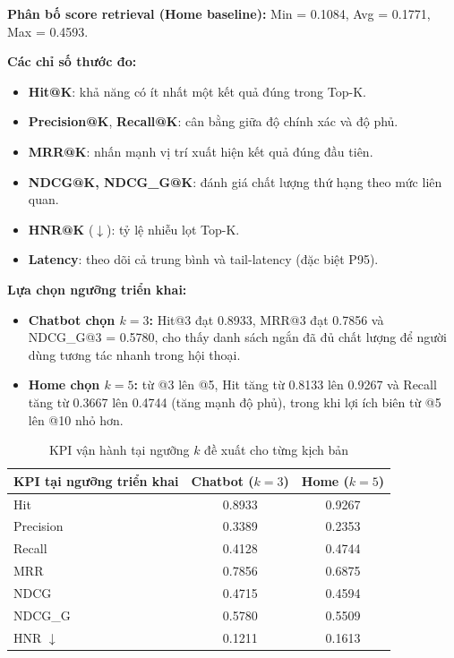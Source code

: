 \noindent\textbf{Phân bố score retrieval (Home baseline):} Min = 0.1084, Avg = 0.1771, Max = 0.4593.

\textbf{Các chỉ số thước đo:}
\begin{itemize}
    \item \textbf{Hit@K}: khả năng có ít nhất một kết quả đúng trong Top-K.
    \item \textbf{Precision@K}, \textbf{Recall@K}: cân bằng giữa độ chính xác và độ phủ.
    \item \textbf{MRR@K}: nhấn mạnh vị trí xuất hiện kết quả đúng đầu tiên.
    \item \textbf{NDCG@K, NDCG\_G@K}: đánh giá chất lượng thứ hạng theo mức liên quan.
    \item \textbf{HNR@K} ($\downarrow$): tỷ lệ nhiễu lọt Top-K.
    \item \textbf{Latency}: theo dõi cả trung bình và tail-latency (đặc biệt P95).
\end{itemize}

\textbf{Lựa chọn ngưỡng triển khai:}
\begin{itemize}
    \item \textbf{Chatbot chọn $k=3$:} Hit@3 đạt 0.8933, MRR@3 đạt 0.7856 và NDCG\_G@3 = 0.5780, cho thấy danh sách ngắn đã đủ chất lượng để người dùng tương tác nhanh trong hội thoại.
    \item \textbf{Home chọn $k=5$:} từ @3 lên @5, Hit tăng từ 0.8133 lên 0.9267 và Recall tăng từ 0.3667 lên 0.4744 (tăng mạnh độ phủ), trong khi lợi ích biên từ @5 lên @10 nhỏ hơn.
\end{itemize}

\begin{table}[H]
\centering
\begin{tabular}{|l|c|c|}
\hline
\textbf{KPI tại ngưỡng triển khai} & \textbf{Chatbot ($k=3$)} & \textbf{Home ($k=5$)} \\
\hline
Hit & 0.8933 & 0.9267 \\
\hline
Precision & 0.3389 & 0.2353 \\
\hline
Recall & 0.4128 & 0.4744 \\
\hline
MRR & 0.7856 & 0.6875 \\
\hline
NDCG & 0.4715 & 0.4594 \\
\hline
NDCG\_G & 0.5780 & 0.5509 \\
\hline
HNR $\downarrow$ & 0.1211 & 0.1613 \\
\hline
\end{tabular}
\caption{KPI vận hành tại ngưỡng $k$ đề xuất cho từng kịch bản}
\label{tab:rec_operating_kpi}
\end{table}

